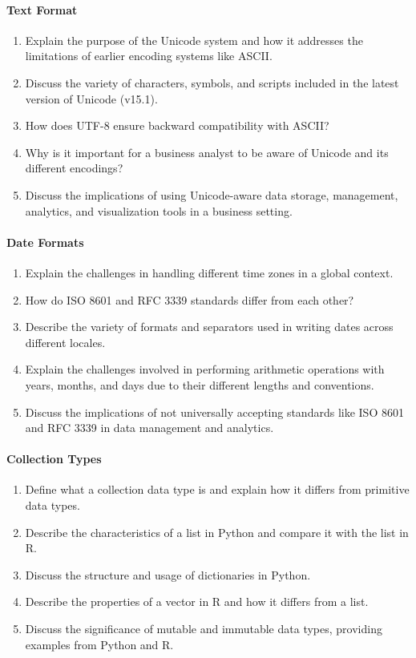 \paragraph*{Text Format}
\begin{enumerate}
    \item Explain the purpose of the Unicode system and how it addresses the limitations of earlier encoding systems like ASCII.
    \item Discuss the variety of characters, symbols, and scripts included in the latest version of Unicode (v15.1).
    \item How does UTF-8 ensure backward compatibility with ASCII?
    \item Why is it important for a business analyst to be aware of Unicode and its different encodings?
    \item Discuss the implications of using Unicode-aware data storage, management, analytics, and visualization tools in a business setting.
\end{enumerate}
\paragraph*{Date Formats}
\begin{enumerate}
    \item Explain the challenges in handling different time zones in a global context.
    \item How do ISO 8601 and RFC 3339 standards differ from each other?
    \item Describe the variety of formats and separators used in writing dates across different locales.
    \item Explain the challenges involved in performing arithmetic operations with years, months, and days due to their different lengths and conventions.
    \item Discuss the implications of not universally accepting standards like ISO 8601 and RFC 3339 in data management and analytics.
\end{enumerate}
\paragraph*{Collection Types}
\begin{enumerate}
    \item Define what a collection data type is and explain how it differs from primitive data types.
    \item Describe the characteristics of a list in Python and compare it with the list in R.
    \item Discuss the structure and usage of dictionaries in Python. 
    \item Describe the properties of a vector in R and how it differs from a list.
    \item Discuss the significance of mutable and immutable data types, providing examples from Python and R.
\end{enumerate}
